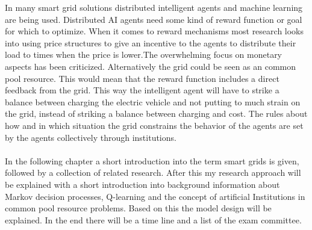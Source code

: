 \documentclass[a4paper]{article}
\begin{document}
In many smart grid solutions distributed intelligent agents and machine learning are being used. Distributed AI agents need some
kind of reward function or goal for which to optimize. When it comes to reward mechanisms most research looks into using price 
structures to give an incentive to the agents to distribute their load to times when the price is lower.The overwhelming focus 
on monetary aspects has been criticized. Alternatively the grid could be seen as an common pool resource. This would mean that 
the reward function includes a direct feedback from the grid. This way the intelligent agent will have to strike a balance 
between charging the electric vehicle and not putting to much strain on the grid, instead of striking a balance between charging 
and cost. The rules about how and in which situation the grid constrains the behavior of the agents are set by the agents collectively 
through institutions. 
\\ \\
In the following chapter a short introduction into the term smart grids is given, followed by a collection of 
related research. After this my research approach will be explained with a short introduction into background 
information about Markov decision processes, Q-learning and the concept of artificial Institutions in common pool 
resource problems. Based on this the model design will be explained. 
In the end there will be a time line and a list of the exam committee. 
\end{document}
